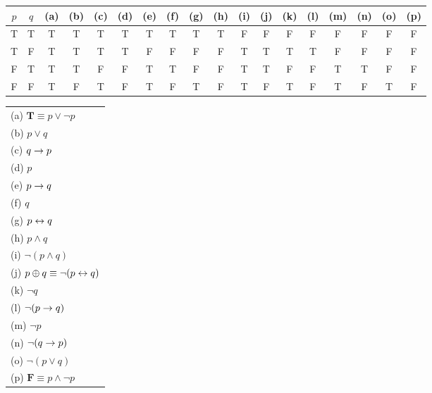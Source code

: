\begin{questions}

\begin{tabular}{cc|cccc|cccc|cccc|cccc}
    $p$ & $q$ & (a) & (b) & (c) & (d) & (e) & (f) & (g) & (h) & (i) & (j) & (k) & (l) & (m) & (n) & (o) & (p) \\
    \hline
    T & T & T & T & T & T & T & T & T & T & F & F & F & F & F & F & F & F \\
    T & F & T & T & T & T & F & F & F & F & T & T & T & T & F & F & F & F \\
    F & T & T & T & F & F & T & T & F & F & T & T & F & F & T & T & F & F \\
    F & F & T & F & T & F & T & F & T & F & T & F & T & F & T & F & T & F \\
 \end{tabular}

\begin{solution}
    \begin{tabular}{l}
    (a) $\mathbf{T} \equiv p \vee \neg p$ \\
    (b) $p \vee q$ \\
    (c) $q \rightarrow p$ \\
    (d) $p$  \\
    (e) $p \rightarrow q$ \\
    (f) $q$ \\
    (g) $p \leftrightarrow q$ \\
    (h) $p \wedge q$ \\
    (i) $\neg (p \wedge q) $  \\
    (j) $p \oplus q \equiv \neg (p \leftrightarrow q)$ \\ 
    (k) $\neg q $ \\
    (l) $\neg (p \rightarrow q) $ \\
    (m) $\neg p$ \\
    (n) $\neg (q \rightarrow p)$ \\ 
    (o) $\neg (p \vee q)$ \\ 
    (p) $\mathbf{F} \equiv p \wedge \neg p$ 
    \end{tabular}
\end{solution}


\end{questions}

